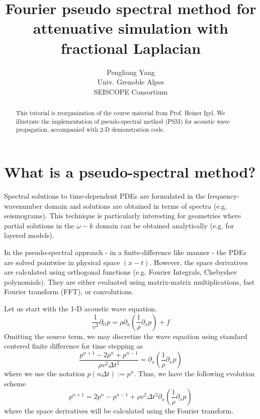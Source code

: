 \title{Fourier pseudo spectral method for attenuative simulation with fractional Laplacian}

\renewcommand{\thefootnote}{\fnsymbol{footnote}}
\author{Pengliang Yang\\
Univ. Grenoble Alpes\\
SEISCOPE Consortium}




\maketitle


\begin{abstract}
This tutorial is reorganization of the course material from Prof. Heiner Igel.
We illustrate the implementation of pseudo-spectral method (PSM) for acoustic wave propagation, accompanied with 2-D demonstration code.
\end{abstract}

\section{What is a pseudo-spectral method?}

Spectral solutions to time-dependent PDEs are formulated in the frequency-wavenumber domain and solutions are obtained in terms of spectra (e.g. seismograms). This
technique is particularly interesting for geometries where partial solutions in the $\omega-k$ domain can be obtained analytically (e.g. for layered models).

In the pseudo-spectral approach - in a finite-difference like manner - the PDEs are solved pointwise in physical space $(x-t)$. However, the space derivatives are calculated using
orthogonal functions (e.g. Fourier Integrals, Chebyshev polynomials). They are either evaluated using matrix-matrix multiplications, fast Fourier transform (FFT), or convolutions.

Let us start with the 1-D acoustic wave equation.
\begin{equation}
 \frac{1}{v^2}\partial_{tt}p=\rho\partial_x\left(\frac{1}{\rho}\partial_x p\right)+f
\end{equation}
Omitting the source term, we may discretize the wave equation using standard centered finite difference for time stepping as
\begin{equation} 
\frac{p^{n+1}-2p^n+p^{n-1}}{\rho v^2\Delta t^2}=\partial_x\left(\frac{1}{\rho}\partial_x p\right)
\end{equation}
where we use the notation $p(n\Delta t):=p^n$. Thus, we have the following evolution scheme
\begin{equation}
 p^{n+1}=2p^n-p^{n-1}+\rho v^2\Delta t^2 \partial_x\left(\frac{1}{\rho}\partial_x p\right)
\end{equation}
where the space derivatives will be calculated using the Fourier transform.

